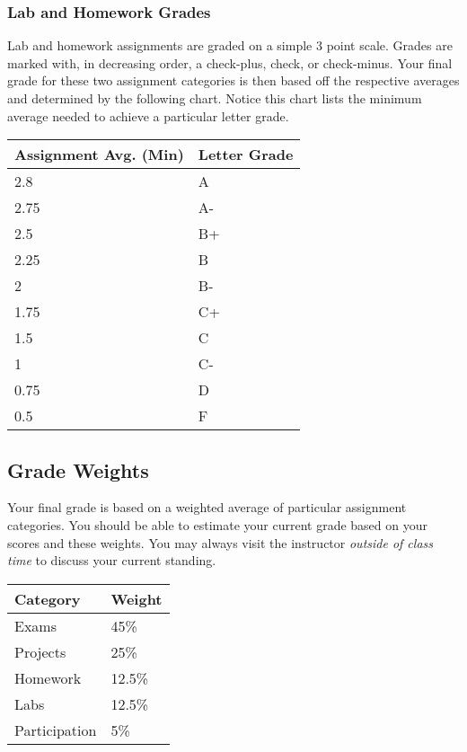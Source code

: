 \documentclass[10pt]{article}
\begin{document}
\subsubsection{Lab and Homework Grades}

Lab and homework assignments are graded on a simple 3 point scale. Grades are marked with, in decreasing order, a check-plus, check, or check-minus. Your final grade for these two assignment categories is then based off the respective averages and determined by the following chart.  Notice this chart lists the minimum average needed to achieve a particular letter grade.

\begin{center}
\begin{small}
\begin{tabular}{ll}
Assignment Avg. (Min) & Letter Grade \\ \toprule
2.8   & A  \\
2.75    & A- \\
2.5 & B+ \\
2.25    & B  \\
2   & B- \\
1.75    & C+ \\
1.5 & C  \\
1   & C- \\
0.75    & D  \\
0.5  & F
\end{tabular}
\end{small}
\end{center}

\subsection{Grade Weights}

Your final grade is based on a weighted average of particular assignment categories.  You should be able to estimate your current grade based on your scores and these weights.  You may always visit the instructor \textit{outside of class time} to discuss your current standing.

\begin{center}
  \begin{tabular}{ll}
  Category & Weight \\ \toprule
    Exams & 45\% \\ %
    Projects & 25\% \\ %
    Homework & 12.5\% \\ %
    Labs & 12.5\% \\ %
    Participation & 5\%
  \end{tabular}
\end{center}
\end{document}
